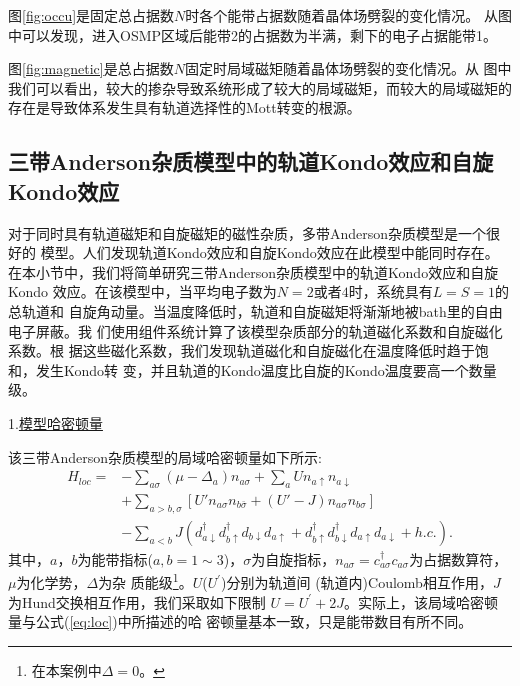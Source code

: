 图\ref{fig:occu}是固定总占据数$N$时各个能带占据数随着晶体场劈裂的变化情况。
从图中可以发现，进入OSMP区域后能带2的占据数为半满，剩下的电子占据能带1。

图\ref{fig:magnetic}是总占据数$N$固定时局域磁矩随着晶体场劈裂的变化情况。从
图中我们可以看出，较大的掺杂导致系统形成了较大的局域磁矩，而较大的局域磁矩的
存在是导致体系发生具有轨道选择性的Mott转变的根源。

\subsection{三带Anderson杂质模型中的轨道Kondo效应和自旋Kondo效应}

对于同时具有轨道磁矩和自旋磁矩的磁性杂质，多带Anderson杂质模型是一个很好的
模型。人们发现轨道Kondo效应和自旋Kondo效应在此模型中能同时存在\cite{werner:166405,yin:1206}。
在本小节中，我们将简单研究三带Anderson杂质模型中的轨道Kondo效应和自旋Kondo
效应。在该模型中，当平均电子数为$N=2$或者$4$时，系统具有$L=S=1$的总轨道和
自旋角动量。当温度降低时，轨道和自旋磁矩将渐渐地被bath里的自由电子屏蔽。我
们使用{\begonia}组件系统计算了该模型杂质部分的轨道磁化系数和自旋磁化系数。根
据这些磁化系数，我们发现轨道磁化和自旋磁化在温度降低时趋于饱和，发生Kondo转
变，并且轨道的Kondo温度比自旋的Kondo温度要高一个数量级。

1.\underline{模型哈密顿量}

该三带Anderson杂质模型的局域哈密顿量如下所示:
\begin{equation}
\begin{split}
H_{loc} = &- \sum_{a\sigma}(\mu - \Delta_a) n_{a\sigma} + \sum_{a} Un_{a\uparrow}n_{a\downarrow} \\
          &+ \sum_{a > b,\sigma}[U'n_{a\sigma}n_{b\bar{\sigma}} + (U'-J)n_{a\sigma}n_{b\sigma}] \\
          &- \sum_{a < b} J (d^{\dagger}_{a\downarrow}d^{\dagger}_{b\uparrow}d_{b\downarrow}d_{a\uparrow} 
           + d^{\dagger}_{b\uparrow}d^{\dagger}_{b\downarrow}d_{a\uparrow}d_{a\downarrow} + h.c.).
\end{split}
\end{equation}
其中，$a$，$b$为能带指标($a, b = 1 \sim 3$)，$\sigma$为自旋指标，$n_{a\sigma} = 
c^{\dagger}_{a\sigma}c_{a\sigma}$为占据数算符，$\mu$为化学势，$\Delta$为杂
质能级\footnote{在本案例中$\Delta = 0$。}。$U$($U^{\prime}$)分别为轨道间
(轨道内)Coulomb相互作用，$J$为Hund交换相互作用，我们采取如下限制
$U=U^{\prime}+2J$。实际上，该局域哈密顿量与公式(\ref{eq:loc})中所描述的哈
密顿量基本一致，只是能带数目有所不同。

